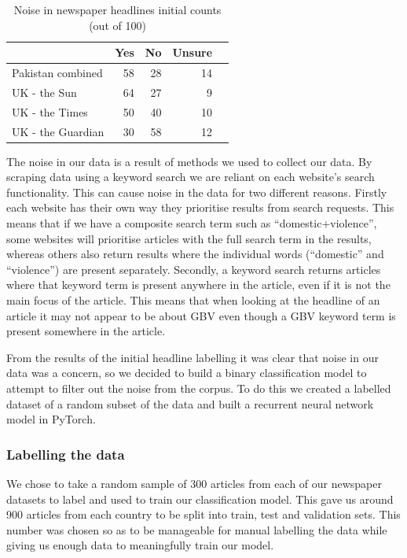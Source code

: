 \documentclass{article}
\begin{document}
{{\begin{table}[!htp]\centering
	\caption{Noise in newspaper headlines initial counts (out of 100)}\label{tab: }
	\scriptsize
	\begin{tabular}{lrrrr}\toprule
		&Yes &No &Unsure \\\midrule
		Pakistan combined &58 &28 &14 \\
		UK - the Sun &64 &27 &9 \\
		UK - the Times &50 &40 &10 \\
		UK - the Guardian &30 &58 &12 \\
		\bottomrule
	\end{tabular}
\end{table}

The noise in our data is a result of methods we used to collect our data. By scraping data using a keyword search we are reliant on each website’s search functionality. This can cause noise in the data for two different reasons. Firstly each website has their own way they prioritise results from search requests. This means that if we have a composite search term such as “domestic+violence”, some websites will prioritise articles with the full search term in the results, whereas others also return results where the individual words (“domestic” and “violence”) are present separately. Secondly, a keyword search returns articles where that keyword term is present anywhere in the article, even if it is not the main focus of the article. This means that when looking at the headline of an article it may not appear to be about GBV even though a GBV keyword term is present somewhere in the article. 

From the results of the initial headline labelling it was clear that noise in our data was a concern, so we decided to build a binary classification model to attempt to filter out the noise from the corpus. To do this we created a labelled dataset of a random subset of the data and built a recurrent neural network model in PyTorch.

\subsubsection{Labelling the data}{
We chose to take a random sample of 300 articles from each of our newspaper datasets to label and used to train our classification model. This gave us around 900 articles from each country to be split into train, test and validation sets. This number was chosen so as to be manageable for manual labelling the data while giving us enough data to meaningfully train our model. 

}}}
\end{document}
